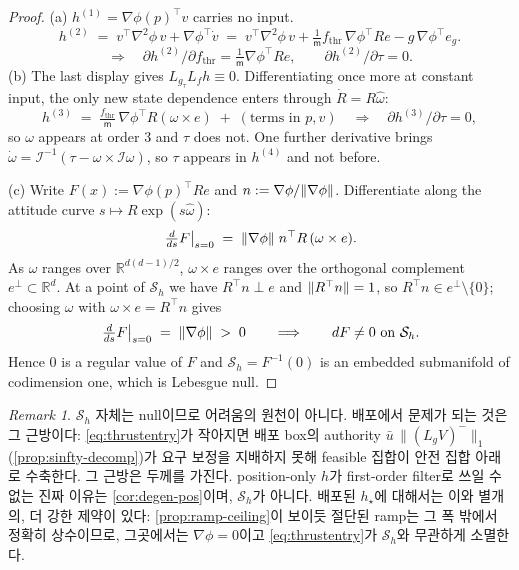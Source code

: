 \documentclass[11pt]{article}
\theoremstyle{plain}
\theoremstyle{definition}
\theoremstyle{remark}
\newtheorem{remark}[theorem]{Remark}
\newcommand{\R}{\mathbb{R}}
\DeclarePairedDelimiter{\norm}{\lVert}{\rVert}
\newcommand{\mass}{\mathsf m}
\newcommand{\inertia}{\mathcal I}
\newcommand{\Lg}{L_g}
\newcommand{\Lf}{L_f}
\newcommand{\grad}{\nabla}
\newcommand{\bignormone}[1]{\lVert#1\rVert_1}
\newcommand{\eqdef}{:=}
\begin{document}
\begin{proof}
(a) $h^{(1)}=\grad\phi(p)^\top v$ carries no input.
\[
h^{(2)}\;=\;v^\top\grad^2\phi\,v+\grad\phi^\top\dot v
\;=\;v^\top\grad^2\phi\,v+\tfrac1{\mass}f_{\mathrm{thr}}\,\grad\phi^\top Re-g\,\grad\phi^\top e_g .
\]
\[
\Longrightarrow\quad \partial h^{(2)}/\partial f_{\mathrm{thr}}=\tfrac1{\mass}\grad\phi^\top Re,
\qquad \partial h^{(2)}/\partial\tau=0 .
\]
(b) The last display gives $L_{g_\tau}\Lf h\equiv0$. Differentiating once more at constant
input, the only new state dependence enters through $\dot R=R\widehat\omega$:
\[
h^{(3)}\;=\;\tfrac{f_{\mathrm{thr}}}{\mass}\,\grad\phi^\top R(\omega\times e)\;+\;(\text{terms in }p,v)
\quad\Longrightarrow\quad \partial h^{(3)}/\partial\tau=0 ,
\]
so $\omega$ appears at order $3$ and $\tau$ does not. One further derivative brings
$\dot\omega=\inertia^{-1}(\tau-\omega\times\inertia\omega)$, so $\tau$ appears in $h^{(4)}$ and
not before.

(c) Write $F(x)\eqdef\grad\phi(p)^\top Re$ and $n\eqdef\grad\phi/\norm{\grad\phi}$. Differentiate
along the attitude curve $s\mapsto R\exp(s\widehat\omega)$:
\[
\left.\tfrac{d}{ds}F\right|_{s=0}\;=\;\norm{\grad\phi}\;n^\top R\,(\omega\times e).
\]
As $\omega$ ranges over $\R^{d(d-1)/2}$, $\omega\times e$ ranges over the orthogonal complement
$e^{\perp}\subset\R^d$. At a point of $\mathcal S_h$ we have $R^\top n\perp e$ and
$\norm{R^\top n}=1$, so $R^\top n\in e^{\perp}\setminus\{0\}$; choosing $\omega$ with
$\omega\times e=R^\top n$ gives
\[
\left.\tfrac{d}{ds}F\right|_{s=0}\;=\;\norm{\grad\phi}\;>\;0
\qquad\Longrightarrow\qquad dF\neq0\ \text{on }\mathcal S_h .
\]
Hence $0$ is a regular value of $F$ and $\mathcal S_h=F^{-1}(0)$ is an embedded submanifold of
codimension one, which is Lebesgue null.
\end{proof}

\begin{remark}\label{rem:collinear}
$\mathcal S_h$ 자체는 null이므로 어려움의 원천이 아니다. 배포에서 문제가 되는 것은 그 근방이다:
\cref{eq:thrustentry}가 작아지면 배포 box의 authority $\bar u\,\bignormone{(\Lg V)^-}$
(\cref{prop:sinfty-decomp})가 요구 보정을 지배하지 못해 feasible 집합이 안전 집합 아래로 수축한다. 그 근방은 두께를 가진다.
position-only $h$가 first-order filter로 쓰일 수 없는 진짜 이유는 \cref{cor:degen-pos}이며,
$\mathcal S_h$가 아니다. 배포된 $h_\star$에 대해서는 이와 별개의, 더 강한 제약이 있다:
\cref{prop:ramp-ceiling}이 보이듯 절단된 ramp는 그 폭 밖에서 정확히 상수이므로, 그곳에서는
$\grad\phi=0$이고 \cref{eq:thrustentry}가 $\mathcal S_h$와 무관하게 소멸한다.
\end{remark}
\end{document}
